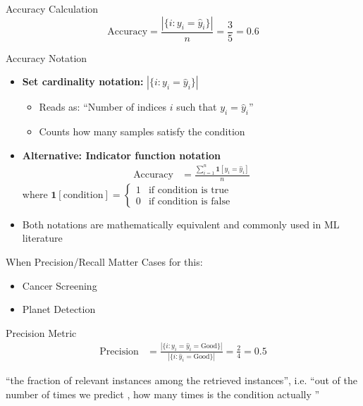 \documentclass[usenames,dvipsnames]{beamer}
\begin{document}
%
\begin{frame}{Accuracy Calculation}
\[
\text{Accuracy} = \frac{|\{i : y_i = \hat{y}_i\}|}{n} = \frac{3}{5} = 0.6
\]
\end{frame}

\begin{frame}{Accuracy Notation}
\begin{itemize}
	\item \textbf{Set cardinality notation:} $|\{i : y_i = \hat{y}_i\}|$ 
	\begin{itemize}
		\item Reads as: ``Number of indices $i$ such that $y_i = \hat{y}_i$''
		\item Counts how many samples satisfy the condition
	\end{itemize}
	
	\item \pause \textbf{Alternative: Indicator function notation}
	\begin{align*}
	\text{Accuracy} &= \frac{\sum_{i=1}^n \mathbf{1}[y_i = \hat{y}_i]}{n}
	\end{align*}
	where $\mathbf{1}[\text{condition}] = \begin{cases} 1 & \text{if condition is true} \\ 0 & \text{if condition is false} \end{cases}$
	
	\item \pause Both notations are mathematically equivalent and commonly used in ML literature
\end{itemize}
\end{frame}

\begin{frame}{When Precision/Recall Matter}
Cases for this:
\begin{itemize}
\item Cancer Screening
\item Planet Detection
\end{itemize}

\end{frame}

\begin{frame}{Precision Metric}
\begin{align*}
\text{Precision} &= \frac{|\{i : y_i = \hat{y}_i = \text{Good}\}|}{|\{i : \hat{y}_i = \text{Good}\}|} = \frac{2}{4} = 0.5
\end{align*}

``the fraction of relevant instances among the retrieved instances'', i.e. ``out of the number of times we predict , how many times is the condition actually ''

\end{frame}
\end{document}
